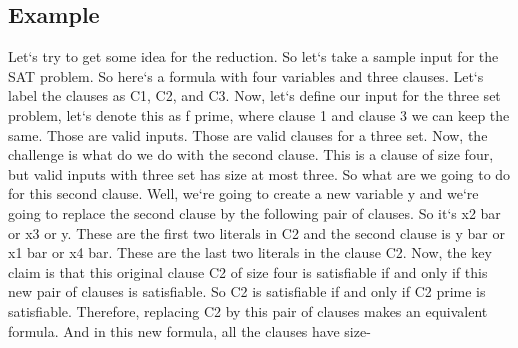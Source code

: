\subsection{Example}
Let`s try to get some idea for the reduction.
So let`s take a sample input for the SAT problem.
So here`s a formula with four variables and three clauses.
Let`s label the clauses as C1, C2, and C3.
Now, let`s define our input for the three set problem, let`s denote this as f prime, where clause 1 and clause 3 we can keep the same.
Those are valid inputs.
Those are valid clauses for a three set.
Now, the challenge is what do we do with the second clause.
This is a clause of size four, but valid inputs with three set has size at most three.
So what are we going to do for this second clause.
Well, we`re going to create a new variable y and we`re going to replace the second clause by the following pair of clauses.
So it`s x2 bar or x3 or y.
These are the first two literals in C2 and the second clause is y bar or x1 bar or x4 bar.
These are the last two literals in the clause C2.
Now, the key claim is that this original clause C2 of size four is satisfiable if and only if this new pair of clauses is satisfiable.
So C2 is satisfiable if and only if C2 prime is satisfiable.
Therefore, replacing C2 by this pair of clauses makes an equivalent formula.
And in this new formula, all the clauses have size-

